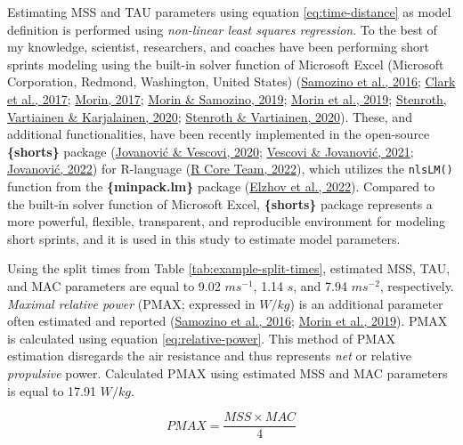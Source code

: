 \documentclass[fleqn,10pt]{wlpeerj} %
\begin{document}
Estimating MSS and TAU parameters using equation \eqref{eq:time-distance} as model definition is performed using \emph{non-linear least squares regression}. To the best of my knowledge, scientist, researchers, and coaches have been performing short sprints modeling using the built-in solver function of Microsoft Excel (Microsoft Corporation, Redmond, Washington, United States) (\protect\hyperlink{ref-samozinoSimpleMethodMeasuring2016}{Samozino et al., 2016}; \protect\hyperlink{ref-clarkNFLCombine40Yard2017}{Clark et al., 2017}; \protect\hyperlink{ref-morinSpreadsheetSprintAcceleration2017}{Morin, 2017}; \protect\hyperlink{ref-morinSpreadsheetSprintAcceleration2019}{Morin \& Samozino, 2019}; \protect\hyperlink{ref-morinSimpleMethodComputing2019}{Morin et al., 2019}; \protect\hyperlink{ref-stenrothForcevelocityProfilingIce2020}{Stenroth, Vartiainen \& Karjalainen, 2020}; \protect\hyperlink{ref-stenrothSpreadsheetSprintAcceleration2020}{Stenroth \& Vartiainen, 2020}). These, and additional functionalities, have been recently implemented in the open-source \textbf{\{shorts\}} package (\protect\hyperlink{ref-jovanovic2020}{Jovanović \& Vescovi, 2020}; \protect\hyperlink{ref-vescoviSprintMechanicalCharacteristics2021}{Vescovi \& Jovanović, 2021}; \protect\hyperlink{ref-R-shorts}{Jovanović, 2022}) for R-language (\protect\hyperlink{ref-R-base}{R Core Team, 2022}), which utilizes the \texttt{nlsLM()} function from the \textbf{\{minpack.lm\}} package (\protect\hyperlink{ref-R-minpack.lm}{Elzhov et al., 2022}). Compared to the built-in solver function of Microsoft Excel, \textbf{\{shorts\}} package represents a more powerful, flexible, transparent, and reproducible environment for modeling short sprints, and it is used in this study to estimate model parameters.

Using the split times from Table \ref{tab:example-split-times}, estimated MSS, TAU, and MAC parameters are equal to 9.02 \(ms^{-1}\), 1.14 \(s\), and 7.94 \(ms^{-2}\), respectively. \emph{Maximal relative power} (PMAX; expressed in \(W/kg\)) is an additional parameter often estimated and reported (\protect\hyperlink{ref-samozinoSimpleMethodMeasuring2016}{Samozino et al., 2016}; \protect\hyperlink{ref-morinSimpleMethodComputing2019}{Morin et al., 2019}). PMAX is calculated using equation \eqref{eq:relative-power}. This method of PMAX estimation disregards the air resistance and thus represents \emph{net} or relative \emph{propulsive} power. Calculated PMAX using estimated MSS and MAC parameters is equal to 17.91 \(W/kg\).

\begin{equation}
  PMAX = \frac{MSS \times MAC}{4} \label{eq:relative-power}
\end{equation}
\end{document}
